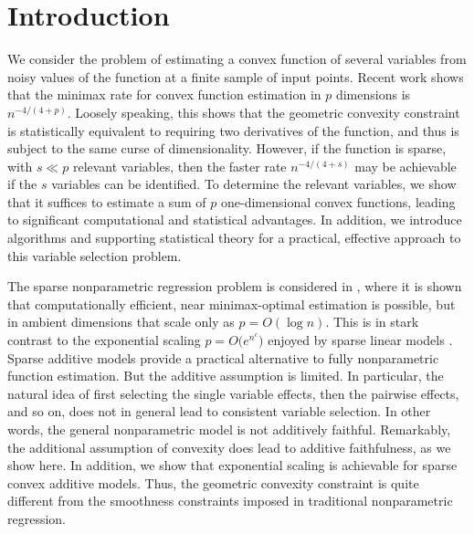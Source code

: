 \section{Introduction}


We consider the problem of estimating a convex function of several
variables from noisy values of the function at a finite sample of
input points.  Recent work \cite{Guntu:12,Guntu:13} shows that the
minimax rate for convex function estimation in $p$ dimensions is
$n^{-4/(4+p)}$.  Loosely speaking, this shows that the
geometric convexity constraint is statistically equivalent to
requiring two derivatives of the function, and thus is
subject to the same curse of dimensionality.
However, if the function is sparse, with $s\ll p$ relevant variables,
then the faster rate $n^{-4/(4+s)}$ may be achievable if the $s$
variables can be identified.  To determine the relevant variables, we
show that it suffices to estimate a sum of $p$ one-dimensional convex
functions, leading to significant computational and statistical
advantages.  In addition, we introduce algorithms and supporting
statistical theory for a practical, effective approach to this
variable selection problem.


The sparse nonparametric regression problem is considered in
\cite{lafferty2008rodeo}, where it is shown that computationally
efficient, near minimax-optimal estimation is possible, but in ambient
dimensions that scale only as $p = O(\log n)$.  This is in stark
contrast to the exponential scaling $p = O\bigl(e^{n^c}\bigr)$ enjoyed
by sparse linear models \cite{Wain:09a}.  Sparse additive models
\cite{Ravikumar:09} provide a practical alternative to fully
nonparametric function estimation.  But the additive assumption is
limited.  In particular, the natural idea of first selecting the
single variable effects, then the pairwise effects, and so on, does
not in general lead to consistent variable selection.  In other words,
the general nonparametric model is not additively faithful.
Remarkably, the additional assumption of convexity does lead to
additive faithfulness, as we show here.  In addition, we show that
exponential scaling is achievable for sparse convex additive models.
Thus, the geometric convexity constraint is quite different from the
smoothness constraints imposed in traditional nonparametric
regression.

